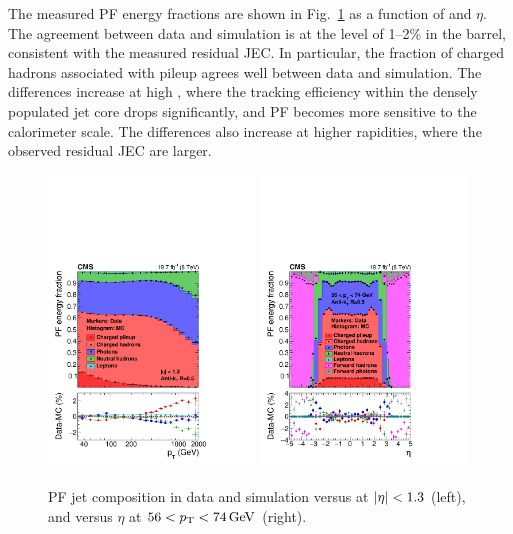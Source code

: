 \documentclass[11pt,twoside,a4paper,cmspaper,final,collab]{cms-tdr}
\begin{document}
The measured PF energy fractions are shown in Fig.~\ref{fig:l3pf} as a function of \pt and $\eta$.
The agreement between data and simulation is at the level of 1--2\% in the barrel, consistent with the measured residual JEC. In particular, the fraction of charged hadrons associated with pileup agrees well between data and simulation.
The differences increase at high \pt, where the tracking efficiency within the densely populated jet core drops significantly, and PF becomes more sensitive to the calorimeter scale. The differences also increase at higher rapidities, where the observed residual JEC are larger.

\begin{figure}[htbp!]
\centering
\includegraphics[width=0.49\textwidth]{Figure_046-a.pdf}
\includegraphics[width=0.49\textwidth]{Figure_046-b.pdf}
\caption{\label{fig:l3pf}
PF jet composition in data and simulation versus \pt at $\lvert \eta \rvert<1.3$ (left), and versus $\eta$ at $56<p_{\mathrm{T}}<74\,\text{Ge\hspace{-.08em}V}$ (right).
}
\end{figure}
\end{document}
